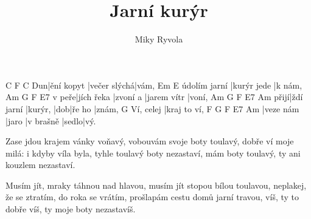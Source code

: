 \documentclass{song}
\title{Jarní kurýr}
\author{Miky Ryvola}
\begin{document}
\strophe
   C          F            C
Dun|ění kopyt |večer slýchá|vám,
             Em          E
údolím jarní |kurýr jede |k nám,
      Am         G        F           E7
v peře|jích řeka |zvoní a |jarem vítr |voní,
     Am         G       F   E7     Am
přijí|ždí jarní |kurýr, |dob|ře ho |znám,
          G
Ví, celej |kraj to ví,
F         G     F         E7    Am
|veze nám |jaro |v brašně |sedlo|vý.
\endstrophe

\strophe*
Zase jdou krajem vánky voňavý,
vobouvám svoje boty toulavý,
dobře ví moje milá: i kdyby víla byla,
tyhle toulavý boty nezastaví,
mám boty toulavý,
ty ani kouzlem nezastaví.
\endstrophe

\strophe*
Musím jít, mraky táhnou nad hlavou,
musím jít stopou bílou toulavou,
neplakej, že se ztratím, do roka se vrátím,
prošlapám cestu domů jarní travou,
víš, ty to dobře víš,
ty moje boty nezastavíš.
\endstrophe
\end{document}
